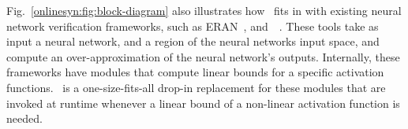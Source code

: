 Fig.~\ref{onlinesyn:fig:block-diagram} also illustrates how~\Name{} fits in with
existing neural network verification frameworks, such as ERAN~\cite{eran},
and~\autolipra{}~\cite{autolipra}. These tools take as input a neural network,
and a region of the neural networks input space, and compute an
over-approximation of the neural network's outputs. Internally, these
frameworks have modules that compute linear bounds for a specific activation
functions.~\Name{} is a one-size-fits-all drop-in replacement for these modules
that are invoked at runtime whenever a linear bound of a non-linear activation function is needed.







